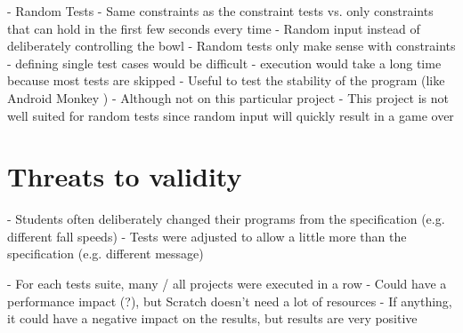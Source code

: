 - Random Tests
- Same constraints as the constraint tests vs. only constraints that can hold in the first few seconds every time
    - Random input instead of deliberately controlling the bowl
    - Random tests only make sense with constraints
        - defining single test cases would be difficult
        - execution would take a long time because most tests are skipped
        - Useful to test the stability of the program (like Android Monkey \cite{androidmonkey})
        - Although not on this particular project
    - This project is not well suited for random tests since random input will quickly result in a game over

\section{Threats to validity}
- Students often deliberately changed their programs from the specification (e.g. different fall speeds)
    - Tests were adjusted to allow a little more than the specification (e.g. different message)

- For each tests suite, many / all projects were executed in a row
    - Could have a performance impact (?), but Scratch doesn't need a lot of resources
    - If anything, it could have a negative impact on the results, but results are very positive
